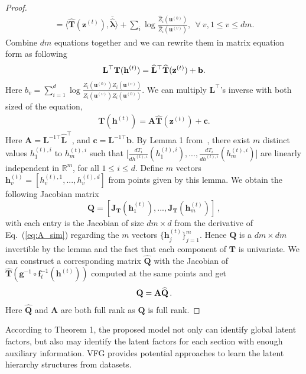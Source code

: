 \documentclass[twoside]{article}
\begin{document}
\begin{proof}
\begin{align}
=\langle \widehat{\mathbf{T}}(\mathbf{z}^{(t)}), \bar{\widehat{\mathbf{\lambda}}}	\rangle + \sum_i\log \frac{\widehat{Z}_i(\mathbf{u}^{(0)})}{\widehat{Z}_i(\mathbf{u}^{(v)})}, \ \ \forall \ v, 1 \leq v \leq dm .
\end{align}
Combine $dm$ equations together and we can rewrite them in matrix equation form as following
\begin{align} \notag
\mathbf{L}^{\top}\mathbf{T}(\mathbf{h}^{(t)}) = \widehat{\mathbf{L}}^{\top}\widehat{\mathbf{T}}(\mathbf{z}^{(t)}) + \mathbf{b}.
\end{align}
Here $b_v=\sum_{i=1}^{d}\log \frac{\widehat{Z}_i(\mathbf{u}^{(0)}) Z_i(\mathbf{u}^{(v)}) }{\widehat{Z}_i(\mathbf{u}^{(v)}) Z_i(\mathbf{u}^{(0)}) }$. We can multiply $\mathbf{L}^{\top}$'s inverse with both sized of the equation, 
\begin{align}\label{eq:A_sim}
\mathbf{T}(\mathbf{h}^{(t)}) = \mathbf{A}\widehat{\mathbf{T}}(\mathbf{z}^{(t)}) + \mathbf{c}.
\end{align}
Here $\mathbf{A} = \mathbf{L}^{-1\top} \widehat{\mathbf{L}}^{\top} $, and $\mathbf{c} = \mathbf{L}^{-1\top} \mathbf{b}$. 
By Lemma 1 from~\cite{Khemakhem20a}, there exist $m$ distinct values $h^{(t),i}_{1}$ to $h^{(t),i}_{m}$ such that $\big[ \frac{d T_i}{ d h^{(t),i}}(h^{(t),i}_{1}), ...,  \frac{d T_i}{ d h^{(t),i}}(h^{(t),i}_{m}) \big]$ are linearly independent in $\mathbb{R}^m$, for all $1\leq i \leq d$. 
Define $m$ vectors $\mathbf{h}^{(t)}_{v}= [h^{(t),1}_v, ..., h^{(t),d}_v]$ from points given by this lemma. 
We obtain the following Jacobian matrix 
$$\mathbf{Q}= [\mathbf{J}_{\mathbf{T}}(\mathbf{h}^{(t)}_1), ..., \mathbf{J}_{\mathbf{T}}(\mathbf{h}^{(t)}_m)] \, ,$$ 
with each entry is the Jacobian of size $dm \times d$ from the derivative of Eq.~(\ref{eq:A_sim}) regarding the $m$ vectors $\{\mathbf{h}^{(t)}_j\}_{j=1}^m$. 
Hence $\mathbf{Q}$ is a $dm \times dm$ invertible by the lemma and the fact that each component of $\mathbf{T}$ is univariate. %
We can construct a corresponding matrix $\widehat{\mathbf{Q}}$ with the Jacobian of $\widehat{\mathbf{T}}(\mathbf{g}^{-1}\circ \mathbf{f}_t^{-1}(\mathbf{h}^{(t)}))$ computed at the same points and get 
\begin{align} \notag
\mathbf{Q} = \mathbf{A}\widehat{\mathbf{Q}} \,.
\end{align}
Here $\widehat{\mathbf{Q}}$ and $\mathbf{A}$ are both full rank as $\mathbf{Q}$ is full rank.
\end{proof}

According to Theorem 1, the proposed model not only can identify global latent factors, but also may identify the latent factors for each section with enough auxiliary information. VFG provides potential approaches to learn the latent hierarchy structures from datasets.
\end{document}
